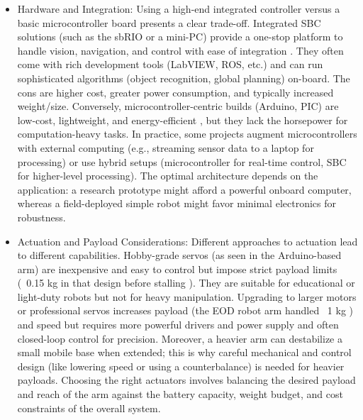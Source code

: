 \documentclass{article}
\begin{document}
\begin{itemize}
  \item Hardware and Integration: Using a high-end integrated controller versus a basic microcontroller board presents a clear trade-off. Integrated SBC solutions (such as the sbRIO or a mini-PC) provide a one-stop platform to handle vision, navigation, and control with ease of integration \cite{7475009}. They often come with rich development tools (LabVIEW, ROS, etc.) and can run sophisticated algorithms (object recognition, global planning) on-board. The cons are higher cost, greater power consumption, and typically increased weight/size. Conversely, microcontroller-centric builds (Arduino, PIC) are low-cost, lightweight, and energy-efficient \cite{YUSOFF20121072}, but they lack the horsepower for computation-heavy tasks. In practice, some projects augment microcontrollers with external computing (e.g., streaming sensor data to a laptop for processing) or use hybrid setups (microcontroller for real-time control, SBC for higher-level processing). The optimal architecture depends on the application: a research prototype might afford a powerful onboard computer, whereas a field-deployed simple robot might favor minimal electronics for robustness.
  
  \item Actuation and Payload Considerations: Different approaches to actuation lead to different capabilities. Hobby-grade servos (as seen in the Arduino-based arm) are inexpensive and easy to control but impose strict payload limits (~0.15 kg in that design before stalling \cite{YUSOFF20121072}). They are suitable for educational or light-duty robots but not for heavy manipulation. Upgrading to larger motors or professional servos increases payload (the EOD robot arm handled ~1 kg \cite{6805994}) and speed but requires more powerful drivers and power supply and often closed-loop control for precision. Moreover, a heavier arm can destabilize a small mobile base when extended; this is why careful mechanical and control design (like lowering speed or using a counterbalance) is needed for heavier payloads. Choosing the right actuators involves balancing the desired payload and reach of the arm against the battery capacity, weight budget, and cost constraints of the overall system.
  

\end{itemize}
\end{document}
